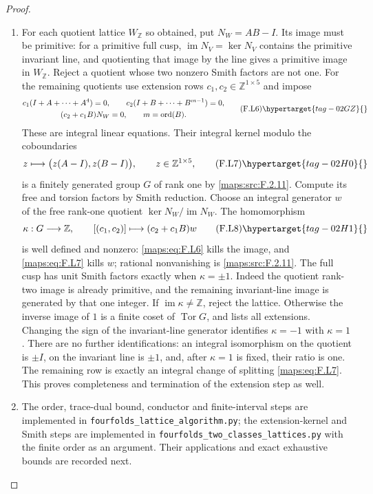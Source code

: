 \begin{proof}
\begin{enumerate}[label={$\langle1\rangle$\arabic*.}]
\item For each quotient lattice $W_{\mathbb Z}$ so obtained,
put $N_W=AB-I$.
Its image must be primitive: for a primitive full cusp,
$\operatorname{im}N_V=\ker N_V$ contains the primitive
invariant line, and quotienting that image by the line
gives a primitive image in $W_{\mathbb Z}$.
Reject a quotient whose two nonzero Smith factors are
not one.  For the remaining quotients use extension rows
$c_1,c_2\in\mathbb Z^{1\times5}$ and impose
\[
\begin{gathered}
 c_1(I+A+\cdots+A^4)=0,
 \qquad c_2(I+B+\cdots+B^{m-1})=0,\\
 (c_2+c_1B)N_W=0,
 \qquad m=\operatorname{ord}(B).
\end{gathered}
 \tag{F.L6}\hypertarget{tag-02GZ}{}\label{maps:eq:F.L6}
\]
These are integral linear equations.  Their integral kernel
modulo the coboundaries
\[
 z\longmapsto\bigl(z(A-I),z(B-I)\bigr),
 \qquad z\in\mathbb Z^{1\times5},
 \tag{F.L7}\hypertarget{tag-02H0}{}\label{maps:eq:F.L7}
\]
is a finitely generated group $G$ of rank one by \ref{maps:src:F.2.11}.
Compute its free and torsion factors by Smith reduction.
Choose an integral generator $w$ of the free rank-one
quotient $\ker N_W/\operatorname{im}N_W$.
The homomorphism
\[
 \kappa:G\longrightarrow\mathbb Z,
 \qquad [(c_1,c_2)]\longmapsto(c_2+c_1B)w
 \tag{F.L8}\hypertarget{tag-02H1}{}\label{maps:eq:F.L8}
\]
is well defined and nonzero: \eqref{maps:eq:F.L6} kills the image, and
\eqref{maps:eq:F.L7} kills $w$; rational nonvanishing is \ref{maps:src:F.2.11}.
The full cusp has unit Smith factors exactly when
$\kappa=\pm1$.
Indeed the quotient rank-two image is already primitive,
and the remaining invariant-line image is generated by
that one integer.
If $\operatorname{im}\kappa\ne\mathbb Z$, reject the
lattice.  Otherwise the inverse image of $1$ is a finite
coset of $\operatorname{Tor}G$, and lists all extensions.
Changing the sign of the invariant-line generator identifies
$\kappa=-1$ with $\kappa=1$.
There are no further identifications: an integral isomorphism
on the quotient is $\pm I$, on the invariant line is
$\pm1$, and, after $\kappa=1$ is fixed, their ratio is one.
The remaining row is exactly an integral change of splitting
\eqref{maps:eq:F.L7}.
This proves completeness and termination of the extension
step as well.

\item The order, trace-dual bound, conductor and finite-interval
steps are implemented in
\texttt{fourfolds\_lattice\_algorithm.py};
the extension-kernel and Smith steps are implemented in
\texttt{fourfolds\_two\_classes\_lattices.py} with the
finite order as an argument.  Their applications and exact
exhaustive bounds are recorded next.

\end{enumerate}
\end{proof}




